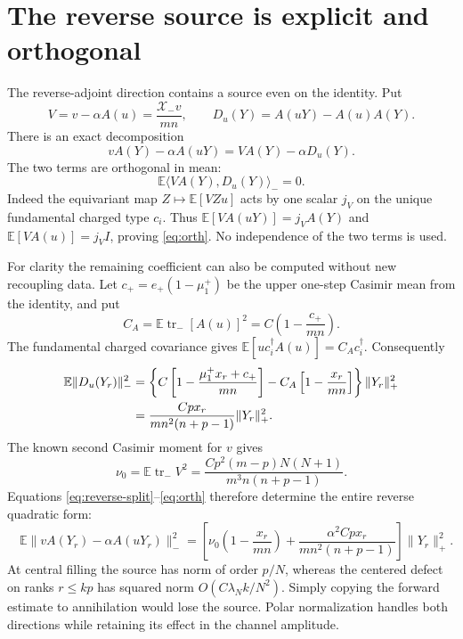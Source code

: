 \documentclass[11pt,a4paper]{article}
\newcommand{\EE}{\mathbb E}
\newcommand{\tr}{\operatorname{tr}}
\newcommand{\XX}{\mathscr X}
\begin{document}
\newpage
\section{The reverse source is explicit and orthogonal}
The reverse-adjoint direction contains a source even on the identity.
Put
\begin{equation}
 V=v-\alpha A(u)=\frac{\XX_-v}{mn},\qquad
 D_u(Y)=A(uY)-A(u)A(Y).
\end{equation}
There is an exact decomposition
\begin{equation}
 vA(Y)-\alpha A(uY)=V A(Y)-\alpha D_u(Y).
 \label{eq:reverse-split}
\end{equation}
The two terms are orthogonal in mean:
\begin{equation}
 \EE\langle V A(Y),D_u(Y)\rangle_-=0.
 \label{eq:orth}
\end{equation}
Indeed the equivariant map $Z\mapsto\EE[VZu]$ acts by one scalar
$j_V$ on the unique fundamental charged type $c_i$. Thus
$\EE[V A(uY)]=j_VA(Y)$ and $\EE[V A(u)]=j_VI$, proving
\eqref{eq:orth}. No independence of the two terms is used.

For clarity the remaining coefficient can also be computed without
new recoupling data. Let $c_+=e_+(1-\mu_1^+)$ be the upper
one-step Casimir mean from the identity, and put
\begin{equation}
 C_A=\EE\tr_-[A(u)]^2=C\left(1-\frac{c_+}{mn}\right).
\end{equation}
The fundamental charged covariance gives
$\EE[u c_i^\dagger A(u)]=C_Ac_i^\dagger$. Consequently
\begin{align}
 \EE\|D_u(Y_r)\|_-^2
 &=\left\{C\left[1-\frac{\mu_1^+x_r+c_+}{mn}\right]
      -C_A\left[1-\frac{x_r}{mn}\right]\right\}\|Y_r\|_+^2\notag\\
 &=\frac{Cp x_r}{m n^2(n+p-1)}\|Y_r\|_+^2.
\end{align}
The known second Casimir moment for $v$ gives
\begin{equation}
 \nu_0=\EE\tr_-V^2
 =\frac{Cp^2(m-p)N(N+1)}{m^3n(n+p-1)}.
\end{equation}
Equations \eqref{eq:reverse-split}--\eqref{eq:orth} therefore determine
the entire reverse quadratic form:
\begin{equation}
 \boxed{\quad
 \EE\|vA(Y_r)-\alpha A(uY_r)\|_-^2
 =\left[\nu_0\left(1-\frac{x_r}{mn}\right)
  +\frac{\alpha^2Cp x_r}{mn^2(n+p-1)}\right]\|Y_r\|_+^2.
 \quad}
\end{equation}
At central filling the source has norm of order $p/N$, whereas
the centered defect on ranks $r\le kp$ has squared norm
$O(C\lambda_N k/N^2)$. Simply copying the forward estimate to
annihilation would lose the source. Polar normalization handles
both directions while retaining its effect in the channel amplitude.
\end{document}
